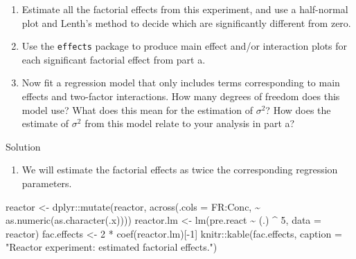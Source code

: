 \documentclass[
]{book}
\newenvironment{Shaded}{\begin{snugshade}}{\end{snugshade}}
\newcommand{\AttributeTok}[1]{\textcolor[rgb]{0.77,0.63,0.00}{#1}}
\newcommand{\DecValTok}[1]{\textcolor[rgb]{0.00,0.00,0.81}{#1}}
\newcommand{\FunctionTok}[1]{\textcolor[rgb]{0.00,0.00,0.00}{#1}}
\newcommand{\NormalTok}[1]{#1}
\newcommand{\OtherTok}[1]{\textcolor[rgb]{0.56,0.35,0.01}{#1}}
\newcommand{\SpecialCharTok}[1]{\textcolor[rgb]{0.00,0.00,0.00}{#1}}
\newcommand{\StringTok}[1]{\textcolor[rgb]{0.31,0.60,0.02}{#1}}
\providecommand{\tightlist}{%
  \setlength{\itemsep}{0pt}\setlength{\parskip}{0pt}}
\theoremstyle{definition}
\theoremstyle{definition}
\theoremstyle{definition}
\theoremstyle{definition}
\theoremstyle{remark}
\begin{document}
\begin{enumerate}
  \begin{enumerate}
  \def\labelenumii{\alph{enumii}.}
  \item
    Estimate all the factorial effects from this experiment, and use a half-normal plot and Lenth's method to decide which are significantly different from zero.
  \item
    Use the \texttt{effects} package to produce main effect and/or interaction plots for each significant factorial effect from part a.
  \item
    Now fit a regression model that only includes terms corresponding to main effects and two-factor interactions. How many degrees of freedom does this model use? What does this mean for the estimation of \(\sigma^2\)? How does the estimate of \(\sigma^2\) from this model relate to your analysis in part a?
  \end{enumerate}
\end{enumerate}

Solution

\begin{enumerate}
\def\labelenumi{\alph{enumi}.}
\tightlist
\item
  We will estimate the factorial effects as twice the corresponding regression parameters.
\end{enumerate}

\begin{Shaded}
\begin{Highlighting}[]
\NormalTok{reactor }\OtherTok{\textless{}{-}}\NormalTok{ dplyr}\SpecialCharTok{::}\FunctionTok{mutate}\NormalTok{(reactor, }\FunctionTok{across}\NormalTok{(}\AttributeTok{.cols =}\NormalTok{ FR}\SpecialCharTok{:}\NormalTok{Conc, }
                                         \SpecialCharTok{\textasciitilde{}} \FunctionTok{as.numeric}\NormalTok{(}\FunctionTok{as.character}\NormalTok{(.x))))}
\NormalTok{reactor.lm }\OtherTok{\textless{}{-}} \FunctionTok{lm}\NormalTok{(pre.react }\SpecialCharTok{\textasciitilde{}}\NormalTok{ (.) }\SpecialCharTok{\^{}} \DecValTok{5}\NormalTok{, }\AttributeTok{data =}\NormalTok{ reactor)}
\NormalTok{fac.effects }\OtherTok{\textless{}{-}} \DecValTok{2} \SpecialCharTok{*} \FunctionTok{coef}\NormalTok{(reactor.lm)[}\SpecialCharTok{{-}}\DecValTok{1}\NormalTok{]}
\NormalTok{knitr}\SpecialCharTok{::}\FunctionTok{kable}\NormalTok{(fac.effects, }\AttributeTok{caption =} \StringTok{"Reactor experiment: estimated factorial effects."}\NormalTok{)}
\end{Highlighting}
\end{Shaded}
\end{document}
